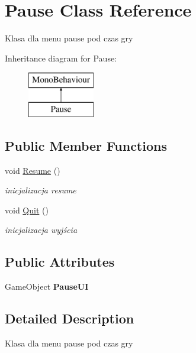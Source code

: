 \hypertarget{class_pause}{}\section{Pause Class Reference}
\label{class_pause}


Klasa dla menu pause pod czas gry  


Inheritance diagram for Pause\+:\begin{figure}[H]
\begin{center}
\leavevmode
\includegraphics[height=2.000000cm]{class_pause}
\end{center}
\end{figure}
\subsection*{Public Member Functions}
\begin{DoxyCompactItemize}
\item 
void \hyperlink{class_pause_a1d1652c23fb2bab829e6d3f7e76727ec}{Resume} ()
\begin{DoxyCompactList}\small\item\em inicjalizacja resume \end{DoxyCompactList}\item 
void \hyperlink{class_pause_a5371367a048d854eba46cf8e2d746776}{Quit} ()
\begin{DoxyCompactList}\small\item\em inicjalizacja wyjścia \end{DoxyCompactList}\end{DoxyCompactItemize}
\subsection*{Public Attributes}
\begin{DoxyCompactItemize}
\item 
\mbox{\label{class_pause_a7c21a7dd8cf53f8165e47d9af8821e54}} 
Game\+Object {\bfseries Pause\+UI}
\end{DoxyCompactItemize}


\subsection{Detailed Description}
Klasa dla menu pause pod czas gry 



